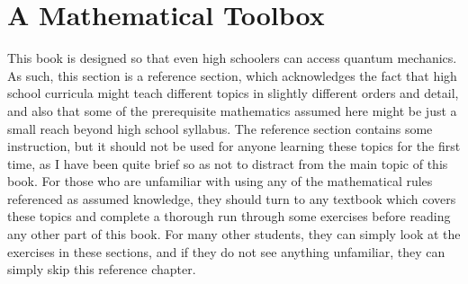 \chapter{A Mathematical Toolbox}
This book is designed so that even high schoolers can access quantum mechanics. As such, this section is a reference section, which acknowledges the fact that high school curricula might teach different topics in slightly different orders and detail, and also that some of the prerequisite mathematics assumed here might be just a small reach beyond high school syllabus. The reference section contains some instruction, but it should not be used for anyone learning these topics for the first time, as I have been quite brief so as not to distract from the main topic of this book. For those who are unfamiliar with using any of the mathematical rules referenced as assumed knowledge, they should turn to any textbook which covers these topics and complete a thorough run through some exercises before reading any other part of this book. For many other students, they can simply look at the exercises in these sections, and if they do not see anything unfamiliar, they can simply skip this reference chapter.
\\\\
